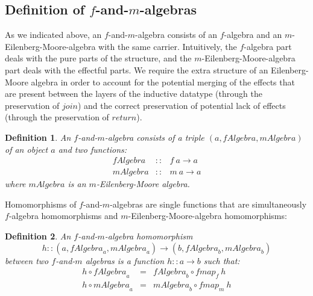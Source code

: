 \documentclass{jfp1}
\newtheorem{definition}{Definition}
\begin{document}
\subsection{Definition of \texorpdfstring{$f$}{f}-and-\texorpdfstring{$m$}{m}-algebras}

As we indicated above, an $f$-and-$m$-algebra consists of an
$f$-algebra and an $m$-Eilenberg-Moore-algebra with the same
carrier. Intuitively, the $f$-algebra part deals with the pure parts
of the structure, and the $m$-Eilenberg-Moore-algebra part deals with
the effectful parts. We require the extra structure of an
Eilenberg-Moore algebra in order to account for the potential merging
of the effects that are present between the layers of the inductive
datatype (through the preservation of $\mathit{join}$) and the correct
preservation of potential lack of effects (through the preservation of
$\mathit{return}$).

\begin{definition}
  An \emph{$f$-and-$m$-algebra} consists of a triple
  $(a,\mathit{fAlgebra},\mathit{mAlgebra})$ of an object $a$ and two
  functions:
  \begin{displaymath}
    \begin{array}{rcl}
      \mathit{fAlgebra} & :: & f~a \to a \\
      \mathit{mAlgebra} & :: & m~a \to a
    \end{array}
  \end{displaymath}
  where $\mathit{mAlgebra}$ is an $m$-Eilenberg-Moore algebra.
\end{definition}

Homomorphisms of $f$-and-$m$-algebras are single functions that are
simultaneously $f$-algebra homomorphisms and
$m$-Eilenberg-Moore-algebra homomorphisms:

\begin{definition}
  An \emph{$f$-and-$m$-algebra homomorphism}
  \begin{displaymath}
    h :: (a, \mathit{fAlgebra}_a, \mathit{mAlgebra}_a) \to (b, \mathit{fAlgebra}_b, \mathit{mAlgebra}_b)
  \end{displaymath}
  between two $f$-and-$m$ algebras is a function $h :: a \to b$ such
  that:
  \begin{displaymath}
    \begin{array}{rcl}
      h \circ \mathit{fAlgebra}_a & = & \mathit{fAlgebra}_b \circ \mathit{fmap}_f~h \\
      h \circ \mathit{mAlgebra}_a & = & \mathit{mAlgebra}_b \circ \mathit{fmap}_m~h
    \end{array}
  \end{displaymath}
\end{definition}
\end{document}
